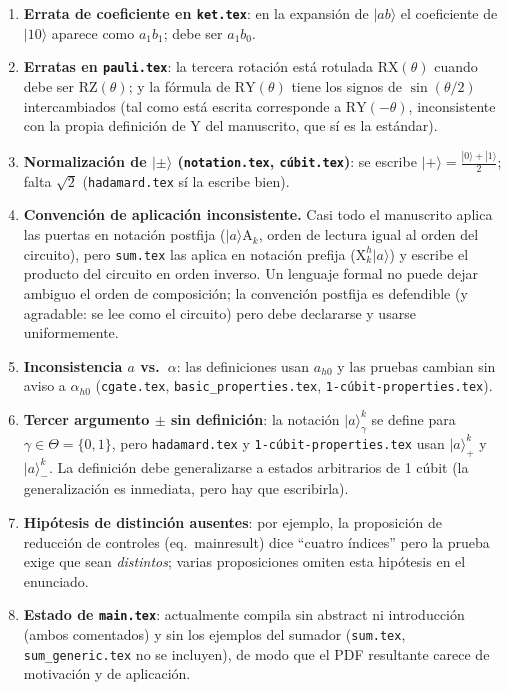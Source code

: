 \documentclass[12pt, a4paper]{article}
\newcommand{\gate}[1]{\text{#1}}
\newcommand{\stateket}[3]{\ket{#1}^{#2}_{#3}}
\newcommand{\stategate}[3]{\gate{#1}^{#2}_{#3}}
\newcommand{\ket}[1]{|#1\rangle}
\begin{document}
\begin{enumerate}
  \item \textbf{Errata de coeficiente en \texttt{ket.tex}}: en la expansión
        de $\ket{ab}$ el coeficiente de $\ket{10}$ aparece como $a_1 b_1$;
        debe ser $a_1 b_0$.

  \item \textbf{Erratas en \texttt{pauli.tex}}: la tercera rotación está
        rotulada $\gate{RX}(\theta)$ cuando debe ser $\gate{RZ}(\theta)$; y
        la fórmula de $\gate{RY}(\theta)$ tiene los signos de
        $\sin(\theta/2)$ intercambiados (tal como está escrita corresponde a
        $\gate{RY}(-\theta)$, inconsistente con la propia definición de
        $\gate{Y}$ del manuscrito, que sí es la estándar).

  \item \textbf{Normalización de $\ket{\pm}$ (\texttt{notation.tex},
          \texttt{cúbit.tex})}: se escribe
        $\ket{+}=\frac{\ket{0}+\ket{1}}{2}$; falta $\sqrt{2}$
        (\texttt{hadamard.tex} sí la escribe bien).

  \item \textbf{Convención de aplicación inconsistente.} Casi todo el
        manuscrito aplica las puertas en notación postfija
        ($\ket{a}\gate{A}_k$, orden de lectura igual al orden del circuito),
        pero \texttt{sum.tex} las aplica en notación prefija
        ($\stategate{X}{h}{k}\ket{a}$) y escribe el producto del circuito en
        orden inverso. Un lenguaje formal no puede dejar ambiguo el orden de
        composición; la convención postfija es defendible (y agradable: se
        lee como el circuito) pero debe declararse y usarse uniformemente.

  \item \textbf{Inconsistencia $a$ vs.\ $\alpha$}: las definiciones usan
        $a_{h0}$ y las pruebas cambian sin aviso a $\alpha_{h0}$
        (\texttt{cgate.tex}, \texttt{basic\_properties.tex},
        \texttt{1-cúbit-properties.tex}).

  \item \textbf{Tercer argumento $\pm$ sin definición}: la notación
        $\stateket{a}{k}{\gamma}$ se define para $\gamma\in\Theta=\{0,1\}$,
        pero \texttt{hadamard.tex} y \texttt{1-cúbit-properties.tex} usan
        $\stateket{a}{k}{+}$ y $\stateket{a}{k}{-}$. La definición debe
        generalizarse a estados arbitrarios de 1 cúbit (la generalización es
        inmediata, pero hay que escribirla).

  \item \textbf{Hipótesis de distinción ausentes}: por ejemplo, la
        proposición de reducción de controles (eq.~mainresult) dice ``cuatro
        índices'' pero la prueba exige que sean \emph{distintos}; varias
        proposiciones omiten esta hipótesis en el enunciado.

  \item \textbf{Estado de \texttt{main.tex}}: actualmente compila sin
        abstract ni introducción (ambos comentados) y sin los ejemplos del
        sumador (\texttt{sum.tex}, \texttt{sum\_generic.tex} no se incluyen),
        de modo que el PDF resultante carece de motivación y de aplicación.
\end{enumerate}
\end{document}
